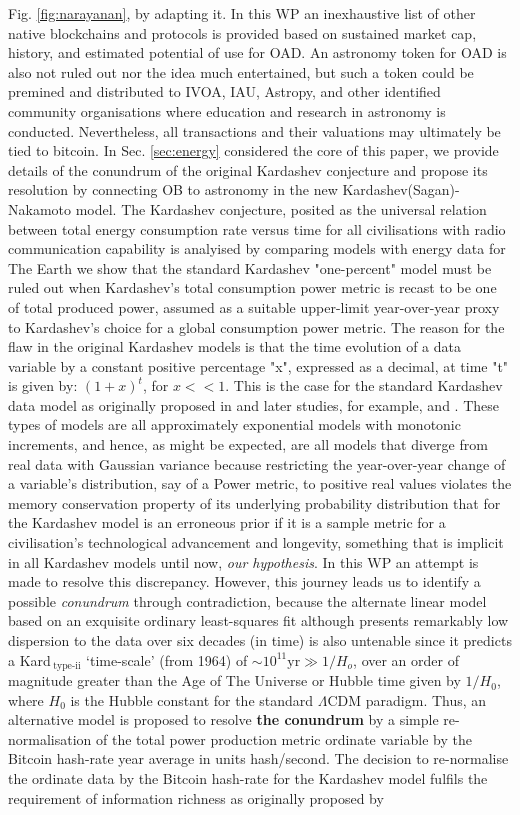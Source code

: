 \documentclass[final,5p,times,twocolumn,authoryear]{elsarticle}
\begin{document}
Fig. \ref{fig:narayanan}, by adapting it. In this WP an inexhaustive list of other native blockchains and protocols is provided based on sustained market cap, history, and estimated potential of use for OAD. An astronomy token for OAD is also not ruled out nor the idea much entertained, but such a token could be premined and distributed to IVOA, IAU, Astropy, and other identified community organisations where education and research in astronomy is conducted. Nevertheless, all transactions and their valuations may ultimately be tied to bitcoin. In Sec. \ref{sec:energy} considered the core of this paper, we provide details of the conundrum of the original Kardashev conjecture and propose its resolution by connecting OB to astronomy in the new Kardashev(Sagan)-Nakamoto model. The Kardashev conjecture, posited as the universal relation between total energy consumption rate versus time for all civilisations with radio communication capability is analyised by comparing models with energy data for The Earth we show that the standard Kardashev "one-percent" model must be ruled out when Kardashev's total consumption power metric is recast to be one of total produced power, assumed as a suitable upper-limit year-over-year proxy to Kardashev's choice for a global consumption power metric. The reason for the flaw in the original Kardashev models is that the time evolution of a data variable by a constant positive percentage "x", expressed as a decimal, at time "t" is given by: $(1+x)^{t}$, for $x<< 1$. This is the case for the standard Kardashev data model as originally proposed in \cite{kar64} and later studies, for example, \cite{sagan73} and \cite{gray2020}. These types of models are all approximately exponential models with monotonic increments, and hence, as might be expected, are all models that diverge from real data with Gaussian variance because restricting the year-over-year change of a variable's distribution, say of a Power metric, to positive real values violates the memory conservation property of its underlying probability distribution that for the Kardashev model is an erroneous prior if it is a sample metric for a civilisation's technological advancement and longevity, something that is implicit in all Kardashev models until now, \textit{our hypothesis}. In this WP an attempt is made to resolve this discrepancy. However, this journey leads us to identify a possible \textit{conundrum} through contradiction, because the alternate linear model based on an exquisite ordinary least-squares fit although presents remarkably low dispersion to the data over six decades (in time) is also untenable since it predicts a Kard$\,_{\textrm{type-ii}}$ `time-scale' (from 1964) of $\sim 10^{11} \textrm{yr} \gg {1/H_o}$, over an order of magnitude greater than the Age of The Universe or Hubble time given by $1/H{_0}$, where $H_{0}$ is the Hubble constant for the standard $\Lambda$CDM paradigm. Thus, an alternative model is proposed to resolve \textbf{ the conundrum} by a simple re-normalisation of the total power production metric ordinate variable by the Bitcoin hash-rate year average in units hash/second. The decision to re-normalise the ordinate data by the Bitcoin hash-rate for the Kardashev model fulfils the requirement of information richness as originally proposed by \cite{kar64} 
\end{document}
